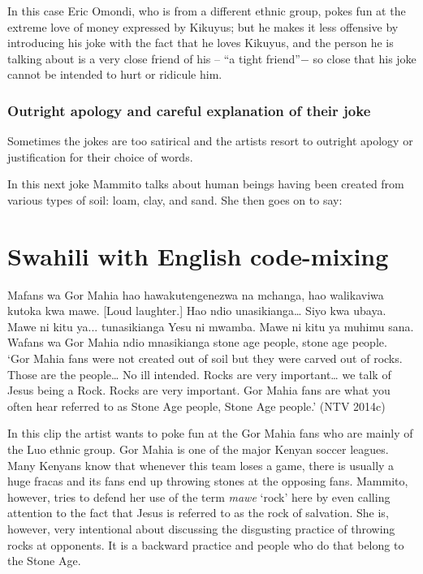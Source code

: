 \documentclass[output=paper]{langsci/langscibook}
\begin{document}
In this case Eric Omondi, who is from a different ethnic group, pokes fun at the extreme love of money expressed by Kikuyus; but he makes it less offensive by introducing his joke with the fact that he loves Kikuyus, and the person he is talking about is a very close friend of his – “a tight friend”$-$ so close that his joke cannot be intended to hurt or ridicule him.

\subsection{Outright apology and careful explanation of their joke }

Sometimes the jokes are too satirical and the artists resort to outright apology or justification for their choice of words. 

In this next joke Mammito talks about human beings having been created from various types of soil: loam, clay, and sand. She then goes on to say:

\chapter{Swahili with English code-mixing}
\gll Mafans wa Gor Mahia hao hawakutengenezwa na mchanga, hao walikaviwa kutoka kwa mawe. \textup{[Loud laughter.]} Hao ndio unasikianga… Siyo kwa ubaya. Mawe ni kitu ya... tunasikianga Yesu ni mwamba. Mawe ni kitu ya muhimu sana. Wafans wa Gor Mahia ndio mnasikianga stone age people, stone age people.\\
\glt ‘Gor Mahia fans were not created out of soil but they were carved out of rocks. Those are the people… No ill intended. Rocks are very important… we talk of Jesus being a Rock. Rocks are very important. Gor Mahia fans are what you often hear referred to as Stone Age people, Stone Age people.’ (NTV 2014c)
\z

In this clip the artist wants to poke fun at the Gor Mahia fans who are mainly of the Luo ethnic group. Gor Mahia is one of the major Kenyan soccer leagues. Many Kenyans know that whenever this team loses a game, there is usually a huge fracas and its fans end up throwing stones at the opposing fans. Mammito, however, tries to defend her use of the term \textit{mawe }‘rock’ here by even calling attention to the fact that Jesus is referred to as the rock of salvation. She is, however, very intentional about discussing the disgusting practice of throwing rocks at opponents. It is a backward practice and people who do that belong to the Stone Age.
\end{document}
